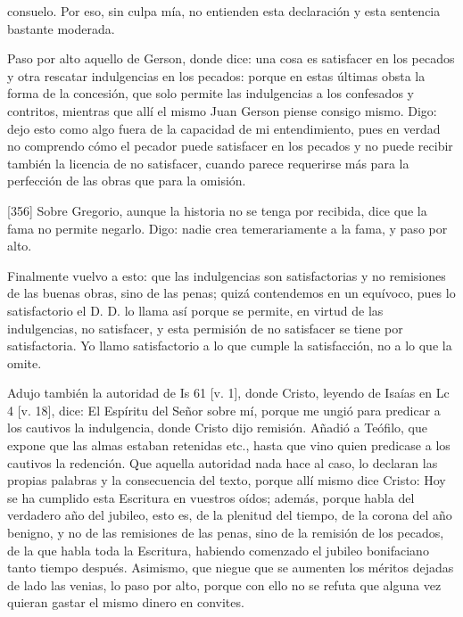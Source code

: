 consuelo. Por eso, sin culpa mía, no entienden esta declaración y esta sentencia bastante moderada.

Paso por alto aquello de Gerson, donde dice: una cosa es satisfacer en los pecados y otra rescatar indulgencias en los pecados: porque en estas últimas obsta la forma de la concesión, que solo permite las indulgencias a los confesados y contritos, mientras que allí el mismo Juan Gerson piense consigo mismo. Digo: dejo esto como algo fuera de la capacidad de mi entendimiento, pues en verdad no comprendo cómo el pecador puede satisfacer en los pecados y no puede recibir también la licencia de no satisfacer, cuando parece requerirse más para la perfección de las obras que para la omisión.

[356] Sobre Gregorio, aunque la historia no se tenga por recibida, dice que la fama no permite negarlo. Digo: nadie crea temerariamente a la fama, y paso por alto.

Finalmente vuelvo a esto: que las indulgencias son satisfactorias y no remisiones de las buenas obras, sino de las penas; quizá contendemos en un equívoco, pues lo satisfactorio el D. D. lo llama así porque se permite, en virtud de las indulgencias, no satisfacer, y esta permisión de no satisfacer se tiene por satisfactoria. Yo llamo satisfactorio a lo que cumple la satisfacción, no a lo que la omite.

Adujo también la autoridad de Is 61 [v. 1], donde Cristo, leyendo de Isaías en Lc 4 [v. 18], dice: El Espíritu del Señor sobre mí, porque me ungió para predicar a los cautivos la indulgencia, donde Cristo dijo remisión. Añadió a Teófilo, que expone que las almas estaban retenidas etc., hasta que vino quien predicase a los cautivos la redención. Que aquella autoridad nada hace al caso, lo declaran las propias palabras y la consecuencia del texto, porque allí mismo dice Cristo: Hoy se ha cumplido esta Escritura en vuestros oídos; además, porque habla del verdadero año del jubileo, esto es, de la plenitud del tiempo, de la corona del año benigno, y no de las remisiones de las penas, sino de la remisión de los pecados, de la que habla toda la Escritura, habiendo comenzado el jubileo bonifaciano tanto tiempo después. Asimismo, que niegue que se aumenten los méritos dejadas de lado las venias, lo paso por alto, porque con ello no se refuta que alguna vez quieran gastar el mismo dinero en convites.

